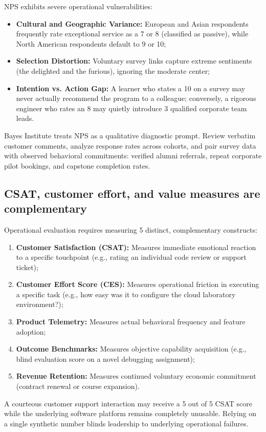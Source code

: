 NPS exhibits severe operational vulnerabilities:
\begin{itemize}
\item \textbf{Cultural and Geographic Variance:} European and Asian respondents frequently rate exceptional service as a 7 or 8 (classified as passive), while North American respondents default to 9 or 10;
\item \textbf{Selection Distortion:} Voluntary survey links capture extreme sentiments (the delighted and the furious), ignoring the moderate center;
\item \textbf{Intention vs. Action Gap:} A learner who states a 10 on a survey may never actually recommend the program to a colleague; conversely, a rigorous engineer who rates an 8 may quietly introduce 3 qualified corporate team leads.
\end{itemize}
Bayes Institute treats NPS as a qualitative diagnostic prompt. Review verbatim customer comments, analyze response rates across cohorts, and pair survey data with observed behavioral commitments: verified alumni referrals, repeat corporate pilot bookings, and capstone completion rates.

\subsection{CSAT, customer effort, and value measures are complementary}

Operational evaluation requires measuring 5 distinct, complementary constructs:
\begin{enumerate}
\item \textbf{Customer Satisfaction (CSAT):} Measures immediate emotional reaction to a specific touchpoint (e.g., rating an individual code review or support ticket);
\item \textbf{Customer Effort Score (CES):} Measures operational friction in executing a specific task (e.g., how easy was it to configure the cloud laboratory environment?);
\item \textbf{Product Telemetry:} Measures actual behavioral frequency and feature adoption;
\item \textbf{Outcome Benchmarks:} Measures objective capability acquisition (e.g., blind evaluation score on a novel debugging assignment);
\item \textbf{Revenue Retention:} Measures continued voluntary economic commitment (contract renewal or course expansion).
\end{enumerate}
A courteous customer support interaction may receive a 5 out of 5 CSAT score while the underlying software platform remains completely unusable. Relying on a single synthetic number blinds leadership to underlying operational failures.

